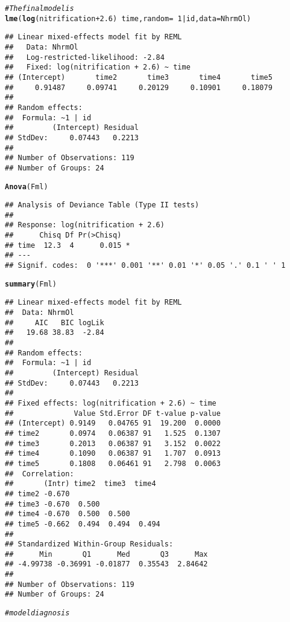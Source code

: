 \documentclass[11pt]{article}\usepackage[]{graphicx}\usepackage[]{color}
\makeatletter
\newcommand{\hlnum}[1]{\textcolor[rgb]{0.686,0.059,0.569}{#1}}%
\newcommand{\hlcom}[1]{\textcolor[rgb]{0.678,0.584,0.686}{\textit{#1}}}%
\newcommand{\hlopt}[1]{\textcolor[rgb]{0,0,0}{#1}}%
\newcommand{\hlstd}[1]{\textcolor[rgb]{0.345,0.345,0.345}{#1}}%
\newcommand{\hlkwc}[1]{\textcolor[rgb]{0.333,0.667,0.333}{#1}}%
\newcommand{\hlkwd}[1]{\textcolor[rgb]{0.737,0.353,0.396}{\textbf{#1}}}%
\newenvironment{kframe}{%
 \def\at@end@of@kframe{}%
 \ifinner\ifhmode%
  \def\at@end@of@kframe{\end{minipage}}%
  \begin{minipage}{\columnwidth}%
 \fi\fi%
 \def\FrameCommand##1{\hskip\@totalleftmargin \hskip-\fboxsep
 \colorbox{shadecolor}{##1}\hskip-\fboxsep
     \hskip-\linewidth \hskip-\@totalleftmargin \hskip\columnwidth}%
 \MakeFramed {\advance\hsize-\width
   \@totalleftmargin\z@ \linewidth\hsize
   \@setminipage}}%
 {\par\unskip\endMakeFramed%
 \at@end@of@kframe}
\newenvironment{knitrout}{}{} %
\makeatother
\begin{document}
\begin{knitrout}
\begin{kframe}
\begin{alltt}
\hlcom{# The final model is}
\hlkwd{lme}\hlstd{(}\hlkwd{log}\hlstd{(nitrification} \hlopt{+} \hlnum{2.6}\hlstd{)} \hlopt{~} \hlstd{time,} \hlkwc{random} \hlstd{=} \hlopt{~}\hlnum{1} \hlopt{|} \hlstd{id,} \hlkwc{data} \hlstd{= NhrmOl)}
\end{alltt}
\begin{verbatim}
## Linear mixed-effects model fit by REML
##   Data: NhrmOl 
##   Log-restricted-likelihood: -2.84
##   Fixed: log(nitrification + 2.6) ~ time 
## (Intercept)       time2       time3       time4       time5 
##     0.91487     0.09741     0.20129     0.10901     0.18079 
## 
## Random effects:
##  Formula: ~1 | id
##         (Intercept) Residual
## StdDev:     0.07443   0.2213
## 
## Number of Observations: 119
## Number of Groups: 24
\end{verbatim}
\begin{alltt}
\hlkwd{Anova}\hlstd{(Fml)}
\end{alltt}
\begin{verbatim}
## Analysis of Deviance Table (Type II tests)
## 
## Response: log(nitrification + 2.6)
##      Chisq Df Pr(>Chisq)  
## time  12.3  4      0.015 *
## ---
## Signif. codes:  0 '***' 0.001 '**' 0.01 '*' 0.05 '.' 0.1 ' ' 1
\end{verbatim}
\begin{alltt}
\hlkwd{summary}\hlstd{(Fml)}
\end{alltt}
\begin{verbatim}
## Linear mixed-effects model fit by REML
##  Data: NhrmOl 
##     AIC   BIC logLik
##   19.68 38.83  -2.84
## 
## Random effects:
##  Formula: ~1 | id
##         (Intercept) Residual
## StdDev:     0.07443   0.2213
## 
## Fixed effects: log(nitrification + 2.6) ~ time 
##              Value Std.Error DF t-value p-value
## (Intercept) 0.9149   0.04765 91  19.200  0.0000
## time2       0.0974   0.06387 91   1.525  0.1307
## time3       0.2013   0.06387 91   3.152  0.0022
## time4       0.1090   0.06387 91   1.707  0.0913
## time5       0.1808   0.06461 91   2.798  0.0063
##  Correlation: 
##       (Intr) time2  time3  time4 
## time2 -0.670                     
## time3 -0.670  0.500              
## time4 -0.670  0.500  0.500       
## time5 -0.662  0.494  0.494  0.494
## 
## Standardized Within-Group Residuals:
##      Min       Q1      Med       Q3      Max 
## -4.99738 -0.36991 -0.01877  0.35543  2.84642 
## 
## Number of Observations: 119
## Number of Groups: 24
\end{verbatim}
\begin{alltt}
\hlcom{# model diagnosis}

\end{alltt}
\end{kframe}
\end{knitrout}
\end{document}
